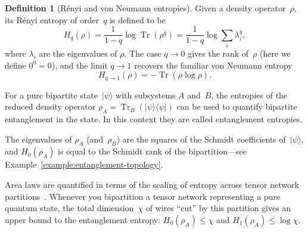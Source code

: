 \documentclass[aps,pra,12pt,nofootinbib,superscriptaddress,longbibliography]{revtex4-1}
\newcommand{\vb}[1]{}
\theoremstyle{plain}
\theoremstyle{definition}
\newtheorem{definition}[theorem]{Definition}
\newcommand{\ket}[1]{\mbox{$|#1\rangle$}}
\newcommand{\ketbra}[2]{\mbox{$|#1\rangle\langle #2|$}}
\DeclareMathOperator{\Tr}{Tr}
\newcommand{\be}{\begin{equation}}
\newcommand{\ee}{\end{equation}}
\begin{document}
\begin{definition}[R{\'e}nyi and von Neumann  entropies]\label{def:entropy}
Given a density operator~$\rho$, its R{\'e}nyi entropy of order~$q$ is defined to be
\begin{equation}\label{eqn:renyi}
 H_q (\rho) = \frac{1}{1-q} \log \Tr(\rho^q) = \frac{1}{1-q} \log \sum_i
\lambda_i^q,
\end{equation}
where $\lambda_i$ are the eigenvalues of $\rho$.  
The case $q\to0$ gives the rank of~$\rho$ (here we define $0^0 = 0$),
and the limit 
$q \to 1$ recovers the familiar von Neumann entropy
\be \label{eqn:vne}
H_{q\rightarrow 1}
(\rho) = - \Tr(\rho \log \rho).
\ee 
\end{definition}
For a pure bipartite state~$\ket{\psi}$ with subsystems $A$ and~$B$,
the entropies of the reduced density operator
$\rho_A = \Tr_B(\ketbra{\psi}{\psi})$
can be used to quantify bipartite entanglement in the state.
In this context they are called entanglement entropies.
\vb{Are all of them used, or just $q=1$?}
The eigenvalues of $\rho_A$ (and~$\rho_B$) are the squares of the Schmidt coefficients of~$\ket{\psi}$, and
$H_0(\rho_A)$ is equal to the Schmidt rank of the bipartition---see Example~\ref{example:entanglement-topology}.

Area laws are quantified in terms of the scaling of entropy across tensor network partitions~\cite{2010RvMP...82..277E}.
Whenever you bipartition a tensor network representing a pure quantum state,
the total dimension~$\chi$ of wires ``cut'' by this partition gives an upper bound to the entanglement entropy:
$H_0(\rho_A) \le \chi$ and
$H_1(\rho_A) \le \log \chi$.
\end{document}
